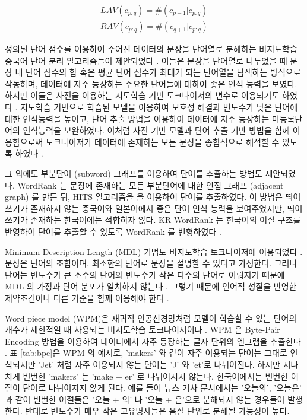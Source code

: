 \documentclass[oneside, ko,phd]{snuthesis_utf8_kor}
\begin{document}
\begin{equation}
\label{eq:av}
\begin{aligned}
LAV(c_{p:q}) = \# (c_{p-1} \vert c_{p:q}) \\
RAV(c_{p:q}) = \# (c_{q+1} \vert c_{p:q}) 
\end{aligned}
\end{equation}

정의된 단어 점수를 이용하여 주어진 데이터의 문장을 단어열로 분해하는 비지도학습 중국어 단어 분리 알고리즘들이 제안되었다 \cite{zhao2008exploiting, feng2004unsupervised}.
이들은 문장을 단어열로 나누었을 때 문장 내 단어 점수의 합 혹은 평균 단어 점수가 최대가 되는 단어열을 탐색하는 방식으로 작동하며, 데이터에 자주 등장하는 주요한 단어들에 대하여 좋은 인식 능력을 보였다.
하지만 이들은 사전을 이용하는 지도학습 기반 토크나이저의 변수로 이용되기도 하였다 \cite{zhao2007incorporating, zhao2008unsupervised, zhao2011integrating, sun2011enhancing, zheng2013deep}.
지도학습 기반으로 학습된 모델을 이용하여 모호성 해결과 빈도수가 낮은 단어에 대한 인식능력을 높이고, 단어 추출 방법을 이용하여 데이터에 자주 등장하는 미등록단어의 인식능력을 보완하였다.
이처럼 사전 기반 모델과 단어 추출 기반 방법을 함께 이용함으로써 토크나이저가 데이터에 존재하는 모든 문장을 종합적으로 해석할 수 있도록 하였다 \cite{zhao2007incorporating}. 

그 외에도 부분단어 (subword) 그래프를 이용하여 단어를 추출하는 방법도 제안되었다.
WordRank \cite{chen2011simple}는 문장에 존재하는 모든 부분단어에 대한 인접 그래프 (adjacent graph) 를 만든 뒤, HITS 알고리즘을 \cite{kleinberg1999authoritative}을 이용하여 단어를 추출하였다.
이 방법은 띄어쓰기가 존재하지 않는 중국어와 일본어에서 좋은 단어 인식 능력을 보여주었지만, 띄어쓰기가 존재하는 한국어에는 적합히자 않다.
KR-WordRank 는 한국어의 어절 구조를 반영하여 단어를 추출할 수 있도록 WordRank 를 변형하였다 \cite{kim2014kr}.

Minimum Description Length (MDL) 기법도 비지도학습 토크나이저에 이용되었다 \cite{kityz1999unsupervised, hewlett2011fully, zhikov2013efficient}.
문장은 단어의 조합이며, 최소한의 단어로 문장을 설명할 수 있다고 가정한다.
그러나 단어는 빈도수가 큰 소수의 단어와 빈도수가 작은 다수의 단어로 이뤄지기 때문에 MDL 의 가정과 단어 분포가 일치하지 않는다 \cite{magistry2013can}.
그렇기 때문에 언어적 성질을 반영한 제약조건이나 다른 기준을 함께 이용해야 한다 \cite{magistry2013can, hewlett2011fully}.

Word piece model (WPM)은 재귀적 인공신경망처럼 모델이 학습할 수 있는 단어의 개수가 제한적일 때 사용되는 비지도학습 토크나이저이다 \cite{sennrich2015neural}.
WPM 은 Byte-Pair Encoding 방법을 이용하여 데이터에서 자주 등장하는 글자 단위의 엔그램을 추출한다 \cite{shibata1999byte}.
표 \ref{tab:bpe}은 WPM 의 예시로, 'makers' 와 같이 자주 이용되는 단어는 그대로 인식되지만 'Jet' 처럼 자주 이용되지 않는 단어는 'J' 와 'et'로 나뉘어진다.
하지만 지나치게 빈번한 'makers' 는 'make + er' 로 나뉘어지지 않는다.
한국어에서는 빈번한 어절이 단어로 나뉘어지지 않게 된다.
예를 들어 뉴스 기사 문서에서는 '오늘의', '오늘은' 과 같이 빈번한 어절들은 '오늘 + 의' 나 '오늘 + 은'으로 분해되지 않는 경우들이 발생한다.
반대로 빈도수가 매우 작은 고유명사들은 음절 단위로 분해될 가능성이 높다.
\end{document}
